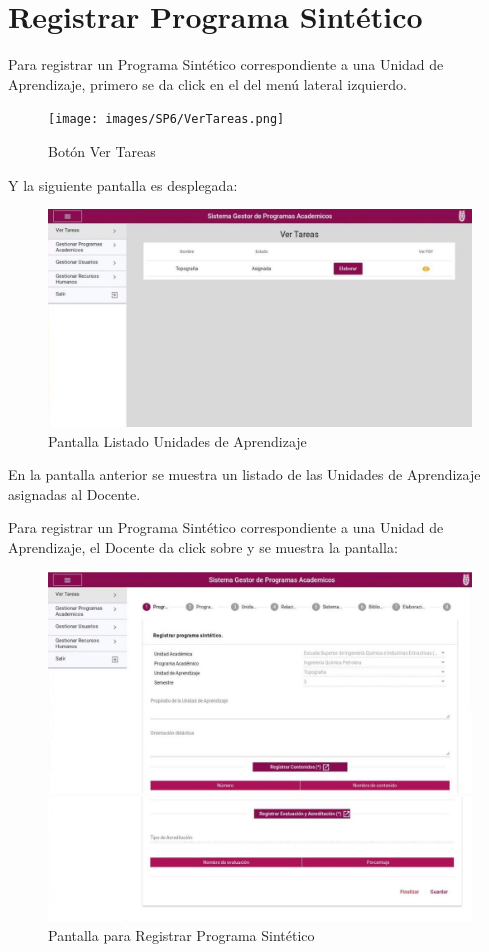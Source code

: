 \section{Registrar Programa Sintético}
Para registrar un Programa Sintético correspondiente a una Unidad de Aprendizaje, primero se da click en el  del menú lateral izquierdo.

\begin{figure}[!hbtp]
    \centering
    \texttt{[image: images/SP6/VerTareas.png]}
    \caption{Botón Ver Tareas} 
\end{figure}

Y la siguiente pantalla es desplegada:

\begin{figure}[H]
    \centering
    \hypertarget{RegLUA}{\includegraphics[width=0.7\linewidth]{images/SP6/PSListado.jpeg}}
    \caption{Pantalla Listado Unidades de Aprendizaje} 
\end{figure}

En la pantalla anterior se muestra un listado de las Unidades de Aprendizaje asignadas al Docente.

Para registrar un Programa Sintético correspondiente a una Unidad de Aprendizaje, el Docente da click sobre  y se muestra la pantalla:


\begin{figure}[H]
    \centering
    \hypertarget{RegPS}{\includegraphics[width=0.7\linewidth]{images/SP6/PSinicio.jpeg}}
    \includegraphics[width=0.7\linewidth]{images/SP6/PSinicio2.jpeg}
    \caption{Pantalla para Registrar Programa Sintético}
\end{figure}

